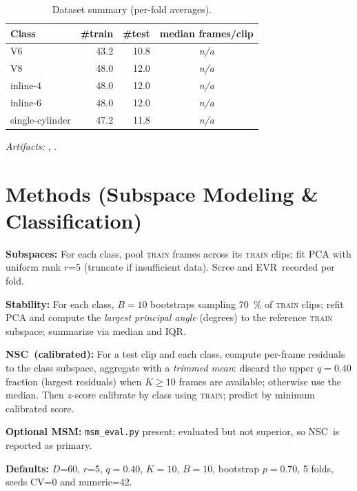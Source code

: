 \documentclass[11pt]{article}
\newcommand{\D}{\ensuremath{D}\xspace}
\newcommand{\rankr}{\ensuremath{r}\xspace}
\newcommand{\EVR}{EVR\xspace}
\newcommand{\NSC}{NSC\xspace}
\begin{document}
\begin{table}[!htbp]
\caption{Dataset summary (per-fold averages).}
\label{tab:data}
\centering
\begin{tabular}{lrrc}
\toprule
\textbf{Class} & \textbf{\#train} & \textbf{\#test} & \textbf{median frames/clip} \\
\midrule
V6               & 43.2 & 10.8 & \textit{n/a} \\
V8               & 48.0 & 12.0 & \textit{n/a} \\
inline-4         & 48.0 & 12.0 & \textit{n/a} \\
inline-6         & 48.0 & 12.0 & \textit{n/a} \\
single-cylinder  & 47.2 & 11.8 & \textit{n/a} \\
\bottomrule
\end{tabular}
\end{table}

\noindent\emph{Artifacts:} , .

\section{Methods (Subspace Modeling \& Classification)}

\textbf{Subspaces:} For each class, pool \textsc{train} frames across its \textsc{train} clips; fit PCA with uniform rank \rankr=5 (truncate if insufficient data). Scree and \EVR\ recorded per fold.

\textbf{Stability:} For each class, $B=10$ bootstraps sampling \SI{70}{\percent} of \textsc{train} clips; refit PCA and compute the \emph{largest principal angle} (degrees) to the reference \textsc{train} subspace; summarize via median and IQR.

\textbf{\NSC\ (calibrated):} For a test clip and each class, compute per-frame residuals to the class subspace, aggregate with a \emph{trimmed mean}: discard the upper $q=0.40$ fraction (largest residuals) when $K\ge 10$ frames are available; otherwise use the median. Then $z$-score calibrate by class using \textsc{train}; predict by minimum calibrated score.

\textbf{Optional MSM:} \texttt{msm\_eval.py} present; evaluated but not superior, so \NSC\ is reported as primary.

\noindent\textbf{Defaults:} \D=60, \rankr=5, $q=0.40$, $K=10$, $B=10$, bootstrap $p=0.70$, 5 folds, seeds CV=0 and numeric=42.
\end{document}
